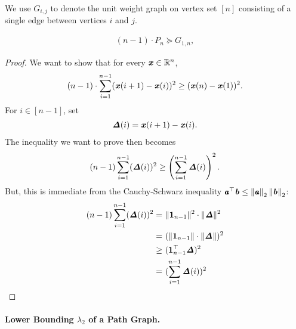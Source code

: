 We use $G_{i,j}$ to denote the unit weight graph on vertex set $[n]$
consisting of a single edge between vertices $i$ and $j$.

\begin{lemma}
  \label{lem:pathineq}
\begin{align*}
(n-1) \cdot P_n \succeq G_{1,n},
\end{align*}
\end{lemma}
\begin{proof}

We want to show that for every $\boldsymbol{\mathit{x}} \in \mathbb{R}^n$,
\begin{align*}
(n-1) \cdot \sum_{i=1}^{n-1} ( \boldsymbol{\mathit{x}}(i+1) - \boldsymbol{\mathit{x}}(i) )^2 \geq ( \boldsymbol{\mathit{x}}(n) - \boldsymbol{\mathit{x}}(1) )^2.
\end{align*}
For $i \in [n-1]$, set
\begin{align*}
\boldsymbol{\mathit{\Delta}} (i) = \boldsymbol{\mathit{x}}(i+1) - \boldsymbol{\mathit{x}}(i).
\end{align*}
The inequality we want to prove then becomes
\begin{align*}
(n-1) \sum_{i=1}^{n-1} ( \boldsymbol{\mathit{\Delta}}(i) )^2 \geq \left( \sum_{i=1}^{n-1} \boldsymbol{\mathit{\Delta}} (i)  \right)^2.
\end{align*}
But, this is immediate from the Cauchy-Schwarz inequality
$\pmb{\mathit{a}}^{\top}\boldsymbol{\mathit{b}} \leq \left\| \pmb{\mathit{a}} \right\|_2\left\| \boldsymbol{\mathit{b}} \right\|_2$:
\begin{align*}
(n-1) \sum_{i=1}^{n-1} ( \boldsymbol{\mathit{\Delta}} (i) )^2
= & ~ \| \boldsymbol{1}_{n-1} \|^2 \cdot \| \boldsymbol{\mathit{\Delta}} \|^2 \\
= & ~ ( \| \boldsymbol{1}_{n-1} \| \cdot \| \boldsymbol{\mathit{\Delta}} \| )^2 \\
\geq & ~  ( \boldsymbol{1}^\top_{n-1} \boldsymbol{\mathit{\Delta}} )^2  \\
= & ~ (  \sum_{i=1}^{n-1} \boldsymbol{\mathit{\Delta}}(i) )^2
\end{align*}
\end{proof}

\paragraph{Lower Bounding $\lambda_2$ of a Path Graph.}

